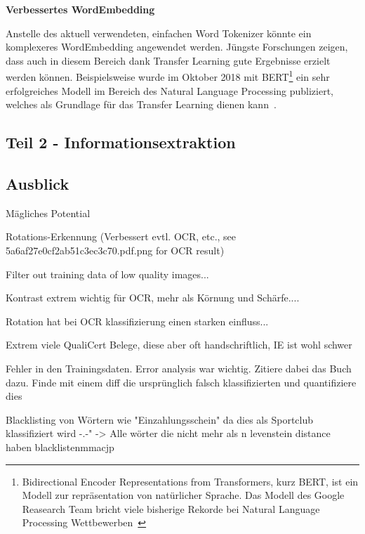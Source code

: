 \textbf{Verbessertes WordEmbedding}

Anstelle des aktuell verwendeten, einfachen Word Tokenizer könnte ein komplexeres WordEmbedding angewendet werden. Jüngste Forschungen zeigen, dass auch in diesem Bereich dank Transfer Learning gute Ergebnisse erzielt werden können. Beispielsweise wurde im Oktober 2018 mit BERT\footnote{Bidirectional Encoder Representations from Transformers, kurz BERT, ist ein Modell zur repräsentation von natürlicher Sprache. Das Modell des Google Reasearch Team bricht viele bisherige Rekorde bei Natural Language Processing Wettbewerben~\autocite{Devlin2018}} ein sehr erfolgreiches Modell im Bereich des Natural Language Processing publiziert, welches als Grundlage für das Transfer Learning dienen kann~\autocite{Devlin2018}.



\subsection{Teil 2 - Informationsextraktion}



\subsection{Ausblick}

Mägliches Potential

Rotations-Erkennung (Verbessert evtl. OCR, etc., see 5a6af27e0cf2ab51c3ec3c70.pdf.png for OCR result)

Filter out training data of low quality images...

Kontrast extrem wichtig für OCR, mehr als Körnung und Schärfe....

Rotation hat bei OCR klassifizierung einen starken einfluss...

Extrem viele QualiCert Belege, diese aber oft handschriftlich, IE ist wohl schwer



Fehler in den Trainingsdaten. Error analysis war wichtig. Zitiere dabei das Buch dazu. Finde mit einem diff die ursprünglich falsch klassifizierten und quantifiziere dies


Blacklisting von Wörtern wie "Einzahlungsschein" da dies als Sportclub klassifiziert wird -.-" -> Alle wörter die nicht mehr als n levenstein distance haben blacklistenmmacjp